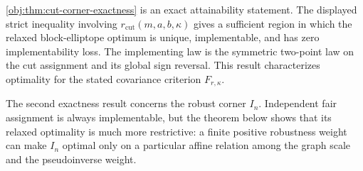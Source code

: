 \documentclass[11pt]{article}
\begin{document}
\cref{obj:thm:cut-corner-exactness} is an exact attainability statement. The displayed strict inequality involving \(r_{\mathrm{cut}}(m,a,b,\kappa)\) gives a sufficient region in which the relaxed block-elliptope optimum is unique, implementable, and has zero implementability loss. The implementing law  is the symmetric two-point law on the cut assignment and its global sign reversal. This result characterizes optimality for the stated covariance criterion \(F_{r,\kappa}\).

The second exactness result concerns the robust corner \(I_n\). Independent fair assignment is always implementable, but the theorem below shows that its relaxed optimality is much more restrictive: a finite positive robustness weight can make \(I_n\) optimal only on a particular affine relation among the graph scale and the pseudoinverse weight.
\end{document}
